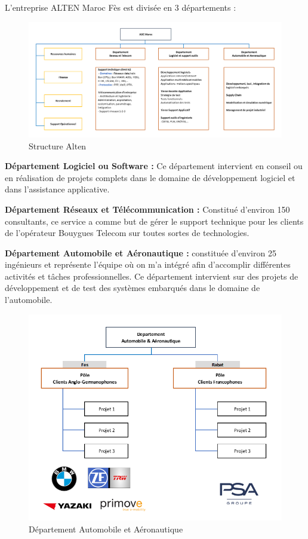 \noindent L’entreprise ALTEN Maroc Fès est divisée en 3 départements : 

\begin{figure}[H]
 \centering
 \includegraphics[scale=0.45]{images/alten_arch}
 \caption{Structure Alten}
\end{figure}

\textbf{Département Logiciel ou Software :} Ce département intervient en conseil ou en réalisation de projets complets dans le domaine de développement logiciel et dans l’assistance applicative.

\textbf{Département Réseaux et Télécommunication :} Constitué d’environ 150 consultants, ce service a comme but de gérer le support technique pour les clients de l’opérateur Bouygues Telecom sur toutes sortes de technologies.

\textbf{Département Automobile et Aéronautique :} constituée d’environ 25 ingénieurs et représente l’équipe où on m’a intégré afin d’accomplir différentes activités et tâches professionnelles. Ce département intervient sur des projets de développement et de test des systèmes embarqués dans le domaine de l’automobile.

\begin{figure}[H]
 \centering
 \includegraphics[scale=0.8]{images/depart_aa}
 \caption{Département Automobile et Aéronautique}
\end{figure}

